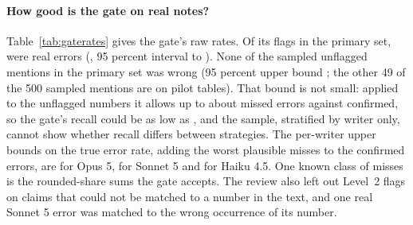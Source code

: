 \documentclass[11pt]{article}
\begin{document}
\paragraph{How good is the gate on real notes?} Table~\ref{tab:gaterates} gives the gate's raw rates. Of its flags in the primary set, \PrecPooledN{} were real errors (\PrecPooled{}, 95 percent interval \PrecPooledLo{} to \PrecPooledHi{}). None of the \MissPooledN{} sampled unflagged mentions in the primary set was wrong (95 percent upper bound \MissPooledHi{}; the other 49 of the 500 sampled mentions are on pilot tables). That bound is not small: applied to the \UnflaggedPrimary{} unflagged numbers it allows up to about \MaxMissed{} missed errors against \ErrTotal{} confirmed, so the gate's recall could be as low as \RecallLower{}, and the sample, stratified by writer only, cannot show whether recall differs between strategies. The per-writer upper bounds on the true error rate, adding the worst plausible misses to the confirmed errors, are \TrueRateHiOpus{} for Opus 5, \TrueRateHiSonnet{} for Sonnet 5 and \TrueRateHiHaiku{} for Haiku 4.5. One known class of misses is the rounded-share sums the gate accepts. The review also left out Level~2 flags on claims that could not be matched to a number in the text, and one real Sonnet 5 error was matched to the wrong occurrence of its number.
\end{document}
